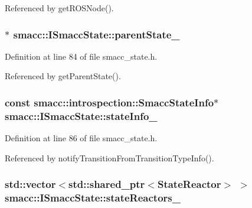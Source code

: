 Referenced by get\+R\+O\+S\+Node().

\subsubsection[{\texorpdfstring{parent\+State\+\_\+}{parentState_}}]{$\ast$ smacc\+::\+I\+Smacc\+State\+::parent\+State\+\_\+\hspace{0.3cm}{\ttfamily [protected]}}\hypertarget{classsmacc_1_1ISmaccState_ad61db41d8d06a836e7d1dac7767f5695}{}\label{classsmacc_1_1ISmaccState_ad61db41d8d06a836e7d1dac7767f5695}


Definition at line 84 of file smacc\+\_\+state.\+h.



Referenced by get\+Parent\+State().

\subsubsection[{\texorpdfstring{state\+Info\+\_\+}{stateInfo_}}]{\setlength{\rightskip}{0pt plus 5cm}const {\bf smacc\+::introspection\+::\+Smacc\+State\+Info}$\ast$ smacc\+::\+I\+Smacc\+State\+::state\+Info\+\_\+\hspace{0.3cm}{\ttfamily [protected]}}\hypertarget{classsmacc_1_1ISmaccState_af20df2cfd3aa826fe02a3d703dc63c1b}{}\label{classsmacc_1_1ISmaccState_af20df2cfd3aa826fe02a3d703dc63c1b}


Definition at line 86 of file smacc\+\_\+state.\+h.



Referenced by notify\+Transition\+From\+Transition\+Type\+Info().

\subsubsection[{\texorpdfstring{state\+Reactors\+\_\+}{stateReactors_}}]{\setlength{\rightskip}{0pt plus 5cm}std\+::vector$<$std\+::shared\+\_\+ptr$<${\bf State\+Reactor}$>$ $>$ smacc\+::\+I\+Smacc\+State\+::state\+Reactors\+\_\+\hspace{0.3cm}{\ttfamily [protected]}}\hypertarget{classsmacc_1_1ISmaccState_a7410a353b515f7b7357e94ef619a6c45}{}\label{classsmacc_1_1ISmaccState_a7410a353b515f7b7357e94ef619a6c45}



